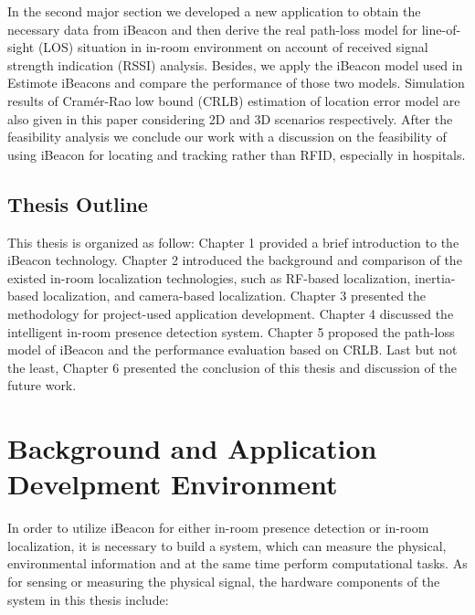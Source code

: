 \documentclass[12pt]{report}
\begin{document}
In the second major section we developed a new application to obtain the necessary data from iBeacon and then derive the real path-loss model for line-of-sight (LOS) situation in in-room environment on account of received signal strength indication (RSSI) analysis. Besides, we apply the iBeacon model used in Estimote iBeacons and compare the performance of those two models. Simulation results of Cramér-Rao low bound (CRLB) estimation of location error model are also given in this paper considering 2D and 3D scenarios respectively. After the feasibility analysis we conclude our work with a discussion on the feasibility of using iBeacon for locating and tracking rather than RFID, especially in hospitals.

\section{Thesis Outline}
This thesis is organized as follow: Chapter 1 provided a brief introduction to the iBeacon technology. Chapter 2 introduced the background and comparison of the existed in-room localization technologies, such as RF-based localization, inertia-based localization, and camera-based localization. Chapter 3 presented the methodology for project-used application development. Chapter 4 discussed the intelligent in-room presence detection system. Chapter 5 proposed the path-loss model of iBeacon and the performance evaluation based on CRLB. Last but not the least, Chapter 6 presented the conclusion of this thesis and discussion of the future work. 


\chapter{Background and Application Develpment Environment}
In order to utilize iBeacon for either in-room presence detection or in-room localization, it is necessary to build a system, which can measure the physical, environmental information and at the same time perform computational tasks. As for sensing or measuring the physical signal, the hardware components of the system in this thesis include:
\end{document}
